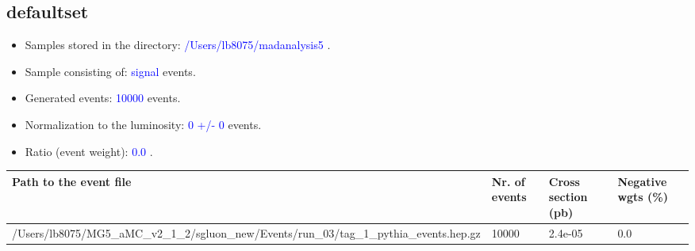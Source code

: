\documentclass[a4paper, 11pt]{article}
\begin{document}
\subsection{ defaultset}

\begin{itemize}
  \item Samples stored in the directory: \textcolor{blue}{/\-Users/\-lb8075/\-madanalysis5} .
   \item Sample consisting of: \textcolor{blue}{signal}  events.
   \item Generated events: \textcolor{blue}{10000 }  events.
   \item Normalization to the luminosity: \textcolor{blue}{0}\textcolor{blue}{ +/\-- }\textcolor{blue}{0 }  events.
   \item Ratio (event weight): \textcolor{blue}{0.0 } .  
 
\end{itemize}
\begin{table}[!h]
  \begin{center}
    \begin{tabular}{|m{51.0mm}|m{24.0mm}|m{28.0mm}|m{28.0mm}|}
      \hline
      \cellcolor{yellow}         Path to the event file& \cellcolor{yellow}         Nr. of events& \cellcolor{yellow}         Cross section (pb)& \cellcolor{yellow}         Negative wgts (\%)\\
      \hline
      \cellcolor{white}          /\-Users/\-lb8075/\-MG5\_aMC\_v2\_1\_2/\-sgluon\_new/\-Events/\-run\_03/\-tag\_1\_pythia\_events.hep.gz& \cellcolor{white}          10000& \cellcolor{white}          2.4e-05& \cellcolor{white}          0.0\\
\hline
    \end{tabular}
  \end{center}
\end{table}
\end{document}
